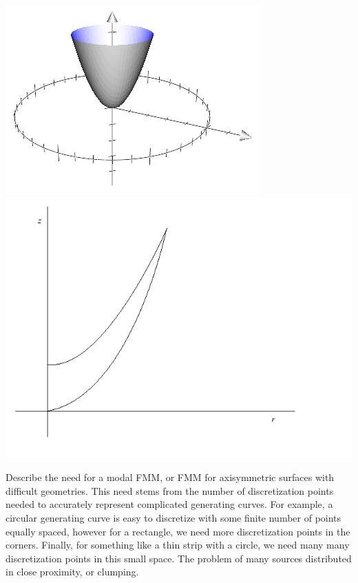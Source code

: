 \documentclass[11pt, oneside]{article}   	%
\begin{document}
\includegraphics[scale=0.5]{bowl3}
\includegraphics[scale=0.35]{bowl}

Describe the need for a modal FMM, or FMM for axisymmetric surfaces with difficult geometries. This need stems from the number of discretization points needed to accurately represent complicated generating curves. For example, a circular generating curve is easy to discretize with some finite number of points equally spaced, however for a rectangle, we need more discretization points in the corners. Finally, for something like a thin strip with a circle, we need many many discretization points in this small space. The problem of many sources distributed in close proximity, or clumping.
\end{document}
